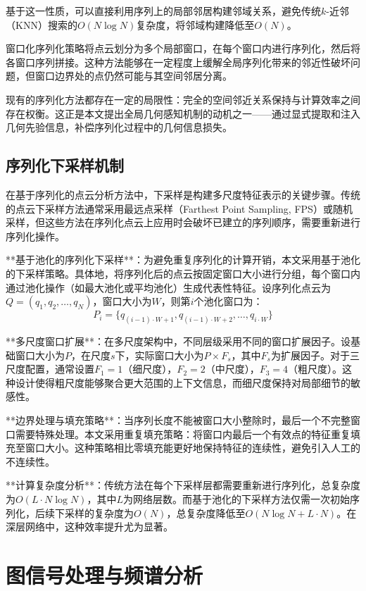 \documentclass[12pt,a4paper,openany,oneside]{ctexbook}
\theoremstyle{definition}
\theoremstyle{remark}
\begin{document}
基于这一性质，可以直接利用序列上的局部邻居构建邻域关系，避免传统$k$-近邻（KNN）搜索的$O(N\log N)$复杂度，将邻域构建降低至$O(N)$。

窗口化序列化策略将点云划分为多个局部窗口，在每个窗口内进行序列化，然后将各窗口序列拼接。这种方法能够在一定程度上缓解全局序列化带来的邻近性破坏问题，但窗口边界处的点仍然可能与其空间邻居分离。

现有的序列化方法都存在一定的局限性：完全的空间邻近关系保持与计算效率之间存在权衡。这正是本文提出全局几何感知机制的动机之一——通过显式提取和注入几何先验信息，补偿序列化过程中的几何信息损失。

\subsection{序列化下采样机制}

在基于序列化的点云分析方法中，下采样是构建多尺度特征表示的关键步骤。传统的点云下采样方法通常采用最远点采样（Farthest Point Sampling, FPS）或随机采样，但这些方法在序列化点云上应用时会破坏已建立的序列顺序，需要重新进行序列化操作。

**基于池化的序列化下采样**：为避免重复序列化的计算开销，本文采用基于池化的下采样策略。具体地，将序列化后的点云按固定窗口大小进行分组，每个窗口内通过池化操作（如最大池化或平均池化）生成代表性特征。设序列化点云为$Q = (q_1, q_2, \ldots, q_N)$，窗口大小为$W$，则第$i$个池化窗口为：
\begin{equation}
P_i = \{q_{(i-1) \cdot W + 1}, q_{(i-1) \cdot W + 2}, \ldots, q_{i \cdot W}\}
\end{equation}

**多尺度窗口扩展**：在多尺度架构中，不同层级采用不同的窗口扩展因子。设基础窗口大小为$P$，在尺度$s$下，实际窗口大小为$P \times F_s$，其中$F_s$为扩展因子。对于三尺度配置，通常设置$F_1 = 1$（细尺度），$F_2 = 2$（中尺度），$F_3 = 4$（粗尺度）。这种设计使得粗尺度能够聚合更大范围的上下文信息，而细尺度保持对局部细节的敏感性。

**边界处理与填充策略**：当序列长度不能被窗口大小整除时，最后一个不完整窗口需要特殊处理。本文采用重复填充策略：将窗口内最后一个有效点的特征重复填充至窗口大小。这种策略相比零填充能更好地保持特征的连续性，避免引入人工的不连续性。

**计算复杂度分析**：传统方法在每个下采样层都需要重新进行序列化，总复杂度为$O(L \cdot N \log N)$，其中$L$为网络层数。而基于池化的下采样方法仅需一次初始序列化，后续下采样的复杂度为$O(N)$，总复杂度降低至$O(N \log N + L \cdot N)$。在深层网络中，这种效率提升尤为显著。

\section{图信号处理与频谱分析}
\end{document}
